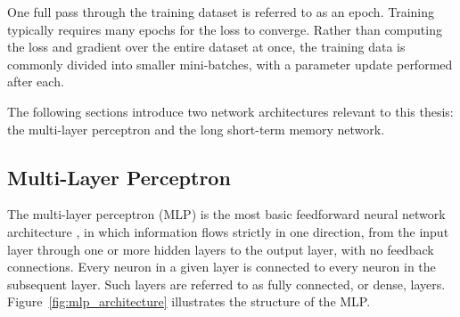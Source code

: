 One full pass through the training dataset is referred to as an epoch. Training typically requires many epochs for the loss to converge. Rather than computing the loss and gradient over the entire dataset at once, the training data is commonly divided into smaller mini-batches, with a parameter update performed after each.

The following sections introduce two network architectures relevant to this thesis: the multi-layer perceptron and the long short-term memory network.





\subsection{Multi-Layer Perceptron}
\label{sec:mlp}

The multi-layer perceptron (MLP) is the most basic feedforward neural network architecture \cite{Goodfellow2016DeepLearning}, in which information flows strictly in one direction, from the input layer through one or more hidden layers to the output layer, with no feedback connections. Every neuron in a given layer is connected to every neuron in the subsequent layer. Such layers are referred to as fully connected, or dense, layers.
Figure~\ref{fig:mlp_architecture} illustrates the structure of the MLP.

